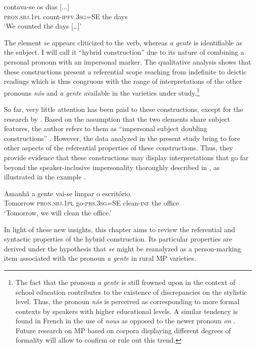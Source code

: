 \documentclass[output=paper]{langscibook}
\begin{document}
\ea\label{ex:henriques:3}
  contava-se os dias [...]\\
         \textsc{pron.sbj.1pl} count-\textsc{ipfv.3sg}=SE the days\\
 \glt `We counted the days […]'
 \z 

The element \textit{se} appears cliticized to the verb, whereas \textit{a gente} is identifiable as the subject. I will call it “hybrid construction” due to its nature of combining a personal pronoun with an impersonal marker. The qualitative analysis shows that these constructions present a referential scope reaching from indefinite to deictic readings which is thus congruous with the range of interpretations of the other  pronouns \textit{nós} and \textit{a gente} available in the varieties under study.\footnote{The fact that the pronoun \textit{a gente} is still frowned upon in the context of school education contributes to the existence of discrepancies on the stylistic level. Thus, the pronoun \textit{nós} is perceived as corresponding to more formal contexts by speakers with higher educational levels. A similar tendency is found in French in the use of \textit{nous} as opposed to the newer  pronoun \textit{on} \citep{Coveney2000}. Future research on MP based on corpora displaying different degrees of formality will allow to confirm or rule out this trend.}



So far, very little attention has been paid to these constructions, except for the research by \citet{Martins2003, Martins2005, Martins2009}. Based on the assumption that the two elements share subject features, the author refers to them as “impersonal subject doubling constructions” \citep{Martins2009}. However, the data analyzed in the present study bring to fore other aspects of the referential properties of these constructions. Thus, they provide evidence that these constructions may display interpretations that go far beyond the speaker-inclusive impersonality thoroughly described in \citet{Martins2009}, as illustrated in the example .


\ea \label{ex:henriques:4} 
\gll Amanhã {a gente} vai-se limpar o escritório.\\
     Tomorrow \textsc{pron.sbj.1pl} go-\textsc{prs.}3\textsc{sg=SE} clean-\textsc{inf} the office\\
\glt ‘Tomorrow, we will clean the office.’
\z

In light of these new insights, this chapter aims to review the referential and syntactic properties of the hybrid construction. Its particular properties are derived under the hypothesis that \textit{se} might be reanalyzed as a person-marking item associated with the  pronoun \textit{a gente} in rural MP varieties. 
\end{document}
